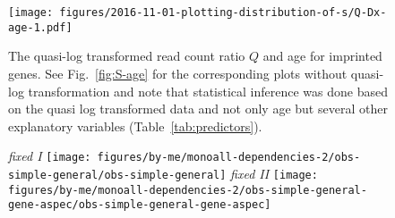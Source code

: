 \documentclass[letterpaper]{article}
\begin{document}
\begin{figure}[H]
\begin{center}
\texttt{[image: figures/2016-11-01-plotting-distribution-of-s/Q-Dx-age-1.pdf]}
\end{center}
\caption{
The quasi-log transformed read count ratio \(Q\) and age for imprinted genes.
See Fig.~\ref{fig:S-age} for the corresponding plots without quasi-log
transformation and note that statistical inference was done based on the quasi
log transformed data and not only age but several other explanatory variables
(Table~\ref{tab:predictors}).
}
\label{fig:Q-age}
\end{figure}

\begin{figure}[H]
\begin{center}
\emph{fixed I}
\texttt{[image: figures/by-me/monoall-dependencies-2/obs-simple-general/obs-simple-general]}
\hspace{\fill}
\emph{fixed II}
\texttt{[image: figures/by-me/monoall-dependencies-2/obs-simple-general-gene-aspec/obs-simple-general-gene-aspec]}


\end{center}
\end{figure}
\end{document}
